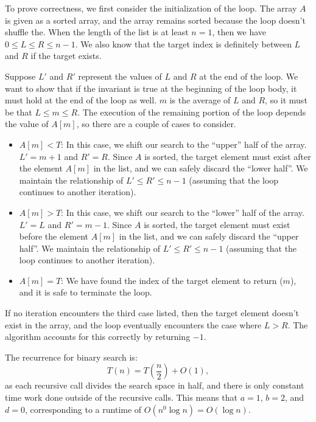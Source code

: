 \documentclass[11pt]{article}
\begin{document}
To prove correctness, we first consider the initialization of the loop. The array $A$ is given as a sorted array, and the array remains sorted because the loop doesn't shuffle the. When the length of the list is at least $n = 1$, then we have $0 \leq L \leq R \leq n - 1$. We also know that the target index is definitely between $L$ and $R$ if the target exists. 

Suppose $L'$ and $R'$ represent the values of $L$ and $R$ at the end of the loop. We want to show that if the invariant is true at the beginning of the loop body, it must hold at the end of the loop as well. $m$ is the average of $L$ and $R$, so it must be that $L \leq m \leq R$. The execution of the remaining portion of the loop depends the value of $A[m]$, so there are a couple of cases to consider. 
\begin{itemize}
    \item $A[m] < T$: In this case, we shift our search to the ``upper'' half of the array. $L' = m + 1$ and $R' = R$. Since $A$ is sorted, the target element must exist after the element $A[m]$ in the list, and we can safely discard the ``lower half''. We maintain the relationship of $L' \leq R' \leq n - 1$ (assuming that the loop continues to another iteration).
    \item $A[m] > T$: In this case, we shift our search to the ``lower'' half of the array. $L' = L$ and $R' = m - 1$. Since $A$ is sorted, the target element must exist before the element $A[m]$ in the list, and we can safely discard the ``upper half''. We maintain the relationship of $L' \leq R' \leq n - 1$ (assuming that the loop continues to another iteration).
    \item $A[m] = T$: We have found the index of the target element to return ($m$), and it is safe to terminate the loop. 
\end{itemize}
If no iteration encounters the third case listed, then the target element doesn't exist in the array, and the loop eventually encounters the case where $L > R$. The algorithm accounts for this correctly by returning $-1$.

The recurrence for binary search is:
\begin{equation}\label{BinSearch}
    T(n) = T \left(\frac{n}{2}\right) + O(1),
\end{equation}
as each recursive call divides the search space in half, and there is only constant time work done outside of the recursive calls. This means that $a = 1$, $b = 2$, and $d = 0$, corresponding to a runtime of $O(n^0 \log n) = O(\log n)$. 
\end{document}
